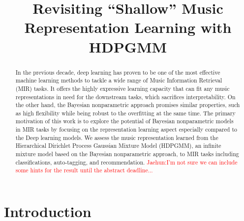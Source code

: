 \documentclass{article}
\title{Revisiting ``Shallow'' Music Representation Learning with HDPGMM}
\begin{document}
%
\maketitle
%
\begin{abstract}
    In the previous decade, deep learning has proven to be one of the most effective machine learning methods to tackle a wide range of Music Information Retrieval (MIR) tasks. It offers the highly expressive learning capacity that can fit any music representations in need for the downstream tasks, which sacrifices interpretability. On the other hand, the Bayesian nonparametric approach promises similar properties, such as high flexibility while being robust to the overfitting at the same time. The primary motivation of this work is to explore the potential of Bayesian nonparametric models in MIR tasks by focusing on the representation learning aspect especially compared to the Deep learning models. We assess the music representation learned from the Hierarchical Dirichlet Process Gaussian Mixture Model (HDPGMM), an infinite mixture model based on the Bayesian nonparametric approach, to MIR tasks including classifications, auto-tagging, and recommendation.
\textcolor{red}{Jaehun:I'm not sure we can include some hints for the result until the abstract deadline...}
\end{abstract}
%
\section{Introduction}\label{sec:introduction}

\end{document}
